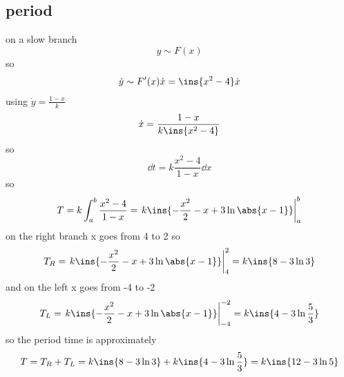 \subsection{period}
on a slow branch 
\begin{equation}
    y \sim F(x)
\end{equation}
so 
\begin{equation}
    \dot{y} \sim F'(x)\dot{x}=\ins{x^2-4}\dot{x}
\end{equation}
using \(\dot{y} = \frac{1-x}{k}\)
\begin{equation}
    \dot{x}=\frac{1-x}{k\ins{x^2-4}}
\end{equation}
so
\begin{equation}
    \dd{t} = k\frac{x^2-4}{1-x}\dd{x}
\end{equation}
so 
\begin{equation}
    T = k\int_{a}^{b}\frac{x^2-4}{1-x} = \left.k\ins{-\frac{x^2}{2}-x+3\ln\abs{x-1}}\right|_a^b
\end{equation}
on the right branch x goes from 4 to 2 so 
\begin{equation}
    T_R = \left.k\ins{-\frac{x^2}{2}-x+3\ln\abs{x-1}}\right|_4^2 = k\ins{8-3\ln3}
\end{equation}
and on the left x goes from -4 to -2
\begin{equation}
    T_L = \left.k\ins{-\frac{x^2}{2}-x+3\ln\abs{x-1}}\right|_{-4}^{-2} = k\ins{4-3\ln\frac{5}{3}}
\end{equation}
so the period time is approximately
\begin{equation}
    T = T_R + T_L = k\ins{8-3\ln3}+k\ins{4-3\ln\frac{5}{3}}=k\ins{12-3\ln5}
\end{equation}